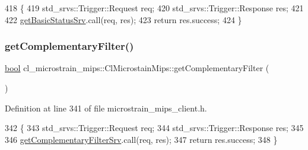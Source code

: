 \begin{DoxyCode}
418     \{
419         std\_srvs::Trigger::Request req;
420         std\_srvs::Trigger::Response res;
421 
422         \hyperlink{classcl__microstrain__mips_1_1ClMicrostainMips_ab2d9efccc6237800a890135a4249eaf8}{getBasicStatusSrv}.call(req, res);
423         \textcolor{keywordflow}{return} res.success;
424     \}
\end{DoxyCode}
\mbox{\label{classcl__microstrain__mips_1_1ClMicrostainMips_aaff58eafdd41438a7af7c6adee3b2d5b}} 
\subsubsection{\texorpdfstring{get\+Complementary\+Filter()}{getComplementaryFilter()}}
{\footnotesize\ttfamily \hyperlink{classbool}{bool} cl\+\_\+microstrain\+\_\+mips\+::\+Cl\+Microstain\+Mips\+::get\+Complementary\+Filter (\begin{DoxyParamCaption}{ }\end{DoxyParamCaption})\hspace{0.3cm}{\ttfamily [inline]}}



Definition at line 341 of file microstrain\+\_\+mips\+\_\+client.\+h.


\begin{DoxyCode}
342     \{
343         std\_srvs::Trigger::Request req;
344         std\_srvs::Trigger::Response res;
345 
346         \hyperlink{classcl__microstrain__mips_1_1ClMicrostainMips_a39aa3d9d1bbe86d90548f7422aa0b4a4}{getComplementaryFilterSrv}.call(req, res);
347         \textcolor{keywordflow}{return} res.success;
348     \}
\end{DoxyCode}
\mbox{\label{classcl__microstrain__mips_1_1ClMicrostainMips_a6826c989f0b2a29b87c6e78140dfe6d1}} 
